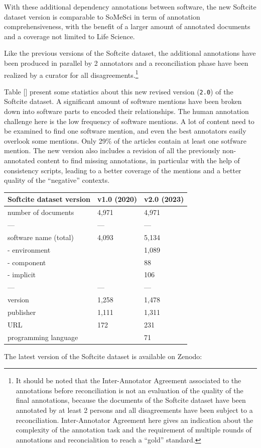 \documentclass[
]{article}
\begin{document}
With these additional dependency annotations between software, the new
Softcite dataset version is comparable to SoMeSci in term of annotation
comprehensiveness, with the benefit of a larger amount of annotated
documents and a coverage not limited to Life Science.

Like the previous versions of the Softcite dataset, the additional
annotations have been produced in parallel by 2 annotators and a
reconciliation phase have been realized by a curator for all
disagreements.\footnote{It should be noted that the Inter-Annotator
  Agreement associated to the annotations before reconciliation is not
  an evaluation of the quality of the final annotations, because the
  documents of the Softcite dataset have been annotated by at least 2
  persons and all disagreements have been subject to a reconciliation.
  Inter-Annotator Agreement here gives an indication about the
  complexity of the annotation task and the requirement of multiple
  rounds of annotations and reconcialition to reach a ``gold'' standard.}

Table {[}{]} present some statistics about this new revised version
(\texttt{2.0}) of the Softcite dataset. A significant amount of software
mentions have been broken down into software parts to encoded their
relationships. The human annotation challenge here is the low frequency
of software mentions. A lot of content need to be examined to find one
software mention, and even the best annotators easily overlook some
mentions. Only 29\% of the articles contain at least one sotfware
mention. The new version also includes a revision of all the previously
non-annotated content to find missing annotations, in particular with
the help of consistency scripts, leading to a better coverage of the
mentions and a better quality of the ``negative'' contexts.

\begin{longtable}[]{@{}lll@{}}
\toprule
Softcite dataset version & v1.0 (2020) & v2.0 (2023)\tabularnewline
\midrule
\endhead
number of documents & 4,971 & 4,971\tabularnewline
--- & --- & ---\tabularnewline
software name (total) & 4,093 & 5,134\tabularnewline
- environment & & 1,089\tabularnewline
- component & & 88\tabularnewline
- implicit & & 106\tabularnewline
--- & --- & ---\tabularnewline
version & 1,258 & 1,478\tabularnewline
publisher & 1,111 & 1,311\tabularnewline
URL & 172 & 231\tabularnewline
programming language & & 71\tabularnewline
\bottomrule
\end{longtable}

The latest version of the Softcite dataset is available on Zenodo:
\end{document}
